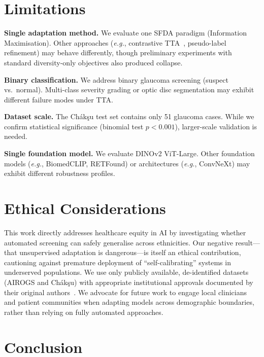 \documentclass[11pt,twocolumn]{article}
\newcommand{\eg}{\emph{e.g.}}
\begin{document}
\section{Limitations}
\label{sec:limitations}

\textbf{Single adaptation method.} We evaluate one SFDA paradigm (Information Maximisation). Other approaches (\eg, contrastive TTA~\citep{chen2022contrastive}, pseudo-label refinement) may behave differently, though preliminary experiments with standard diversity-only objectives also produced collapse.

\textbf{Binary classification.} We address binary glaucoma screening (suspect vs.\ normal). Multi-class severity grading or optic disc segmentation may exhibit different failure modes under TTA.

\textbf{Dataset scale.} The Ch\'{a}k\c{s}u test set contains only 51 glaucoma cases. While we confirm statistical significance (binomial test $p < 0.001$), larger-scale validation is needed.

\textbf{Single foundation model.} We evaluate DINOv2 ViT-Large. Other foundation models (\eg, BiomedCLIP, RETFound) or architectures (\eg, ConvNeXt) may exhibit different robustness profiles.

\section{Ethical Considerations}
\label{sec:ethics}

This work directly addresses healthcare equity in AI by investigating whether automated screening can safely generalise across ethnicities. Our negative result---that unsupervised adaptation is dangerous---is itself an ethical contribution, cautioning against premature deployment of ``self-calibrating'' systems in underserved populations. We use only publicly available, de-identified datasets (AIROGS and Ch\'{a}k\c{s}u) with appropriate institutional approvals documented by their original authors~\citep{vermeer2024airogs, kumar2023chakshu}. We advocate for future work to engage local clinicians and patient communities when adapting models across demographic boundaries, rather than relying on fully automated approaches.

\section{Conclusion}
\label{sec:conclusion}
\end{document}
